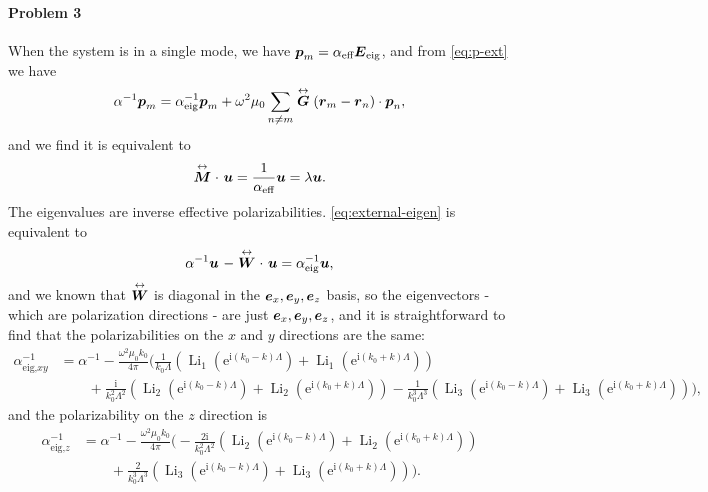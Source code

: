 \documentclass[hyperref, a4paper]{article}
\newcommand*{\ii}{\mathrm{i}}
\newcommand*{\ee}{\mathrm{e}}
\DeclareMathOperator{\li}{Li}
\renewcommand{\tensor}[1]{ \stackrel{\leftrightarrow}{\vb*{#1}}}
\begin{document}
\paragraph{Problem 3} When the system is in a single mode, we have $\vb*{p}_m = \alpha_\text{eff} 
\vb*{E}_\text{eig}$, and from \eqref{eq:p-ext} we have 
\[
    \alpha^{-1} \vb*{p}_m = \alpha_\text{eig}^{-1} \vb*{p}_m + \omega^2 \mu_0 \sum_{n \neq m} \tensor{\vb*{G}}(\vb*{r}_m - \vb*{r}_n) \cdot \vb*{p}_n,
\]
and we find it is equivalent to 
\begin{equation}
    \tensor{\vb*{M}} \cdot \ \vb*{u} = \frac{1}{\alpha_\text{eff}} \vb*{u} = \lambda \vb*{u}.
    \label{eq:external-eigen}
\end{equation}
The eigenvalues are inverse effective polarizabilities. \eqref{eq:external-eigen} is equivalent to 
\[
    \alpha^{-1} \vb*{u} \ - \tensor{\vb*{W}} \cdot \ \vb*{u} = \alpha_\text{eig}^{-1} \vb*{u},
\]
and we known that $\tensor{\vb*{W}}$ is diagonal in the $\vb*{e}_x, \vb*{e}_y, \vb*{e}_z$ basis, so the
eigenvectors - which are polarization directions - are just $\vb*{e}_x, \vb*{e}_y, \vb*{e}_z$, and it is straightforward to find that the 
polarizabilities on the $x$ and $y$ directions are the same: 
\begin{equation}
    \begin{aligned}
        \alpha_\text{eig,$xy$}^{-1} &= \alpha^{-1} - \frac{\omega^2 \mu_0 k_0}{4 \pi} \biggl( \frac{1}{k_0 \Lambda} (\li_1(\ee^{\ii (k_0 - k) \Lambda}) + \li_1(\ee^{\ii (k_0 + k) \Lambda})) \\
        &\quad \quad + \frac{\ii}{k_0^2 \Lambda^2} (\li_2(\ee^{\ii (k_0 - k) \Lambda}) + \li_2(\ee^{\ii (k_0 + k) \Lambda})) - \frac{1}{k_0^3 \Lambda^3} (\li_3(\ee^{\ii (k_0 - k) \Lambda}) + \li_3(\ee^{\ii (k_0 + k) \Lambda})) \biggr),
    \end{aligned}
    \label{eq:alpha-xy}
\end{equation}
and the polarizability on the $z$ direction is 
\begin{equation}
    \begin{aligned}
        \alpha_\text{eig,$z$}^{-1} &= \alpha^{-1} - \frac{\omega^2 \mu_0 k_0}{4 \pi} \biggl( - \frac{2\ii}{k_0^2 \Lambda^2} (\li_2(\ee^{\ii (k_0 - k) \Lambda}) + \li_2(\ee^{\ii (k_0 + k) \Lambda})) \\
        &\quad \quad  + \frac{2}{k_0^3 \Lambda^3} (\li_3(\ee^{\ii (k_0 - k) \Lambda}) + \li_3(\ee^{\ii (k_0 + k) \Lambda})) \biggr).
    \end{aligned}
    \label{eq:alpha-z}
\end{equation}
\end{document}
